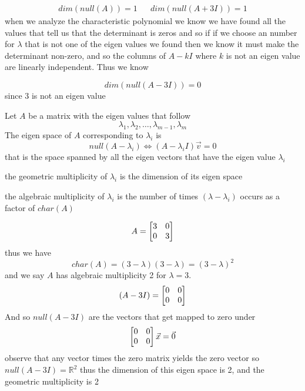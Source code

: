 \documentclass[11pt]{book}
\begin{document}
\begin{eg}
\begin{itemize}
        \begin{align*}
            \mathit{dim} \left(\mathit{null} \left(A\right) \right) = 1 && \mathit{dim} \left(\mathit{null} \left(A + 3I\right) \right) = 1
        \end{align*}
    when we analyze the characteristic polynomial we know we have found all the values that tell us that the determinant is zeros and so if if we choose an number for $\lambda $ that is not one of the eigen values we found then we know it must make the determinant non-zero, and so the columns of $A - kI$ where $k$ is not an eigen value are linearly independent. Thus we know 
        
        \[
        \mathit{dim} \left(\mathit{null} \left(A - 3I\right) \right) = 0
        \]
        since $3$ is not an eigen value  
    \end{itemize}
\end{eg}

\begin{defn}\label{defn:eigen_space}
    Let $A$  be a matrix with the eigen values that follow
    \[
    \lambda _{1}, \lambda _{2},  \ldots,  \lambda _{m - 1}, \lambda _{m}  
    \]
    The eigen space of $A$ corresponding to $\lambda _{i} $ is 
    \[
        \mathit{null} \left(A - \lambda _{i} \right) \Leftrightarrow \left( A - \lambda _{i} I \right) \vec{v} = 0
    \]
    that is the space spanned by all the eigen vectors that have the eigen value $\lambda _{i} $  
\end{defn}

\begin{defn}\label{defn:geometric_multiplicity}
    the geometric multiplicity of $\lambda _{i} $ is the dimension of its eigen space  
\end{defn}

\begin{defn}\label{defn:algebraic_multiplicity}
    the algebraic multiplicity of $\lambda _{i} $ is the number of times $\left( \lambda  - \lambda _{i}  \right) $ occurs as a factor of $char\left(A\right) $ 
\end{defn}

\begin{eg}
    \[
    A= \begin{bmatrix} 3 & 0 \\ 0 & 3 \end{bmatrix}
    \]
    thus we have 
    \[
        char\left(A\right) = \left( 3 - \lambda  \right) \left( 3 - \lambda  \right) = \left( 3 - \lambda  \right) ^2 
    \]
    and we say $A$ has algebraic multiplicity 2 for $\lambda = 3$. 
    \[
        \left( A - 3I \right) = \begin{bmatrix} 0 & 0 \\ 0 & 0 \end{bmatrix}
    \]
    And so $\mathit{null} \left(A - 3I\right) $ are the vectors that get mapped to zero under
    \[
    \begin{bmatrix} 0 & 0 \\ 0 & 0 \end{bmatrix}\vec{x} = \vec{0} 
    \]
    observe that any vector times the zero matrix yields the zero vector so $\mathit{null} \left(A - 3I\right) = \mathbb{R} ^2 $ thus the dimension of this eigen space is 2, and the geometric multiplicity is 2    
\end{eg}
\end{document}
